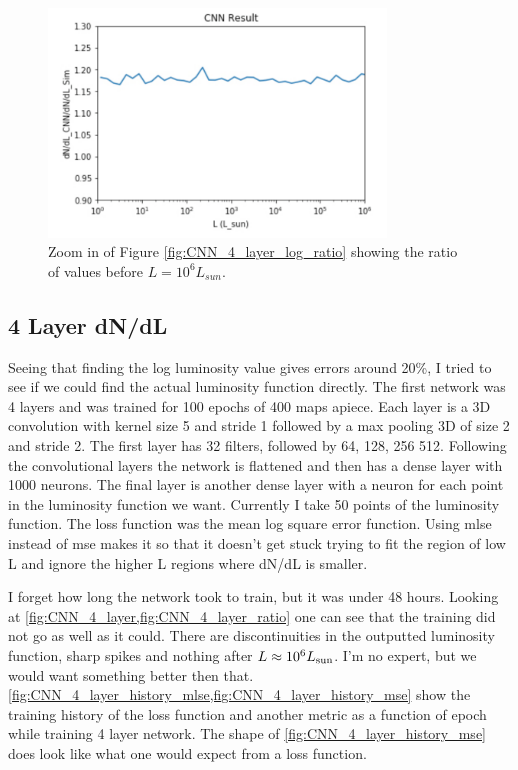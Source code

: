 \documentclass{article}
\begin{document}
			\begin{figure}[H]
				\centering
				\includegraphics[width=0.8\textwidth]{CNN_4_layer_log_unlog_ratio_small.pdf}
				\caption{Zoom in of Figure \ref{fig:CNN_4_layer_log_ratio} showing the ratio of values before \(L = 10^6 L_{sun}\).}
				\label{fig:CNN_4_layer_log_unlog_ratio_small}
			\end{figure}

		\subsection{4 Layer dN/dL} \label{sec:4directValue}
			Seeing that finding the log luminosity value gives errors around 20\%, I tried to see if we could find the actual luminosity function directly.  The first network was 4 layers and was trained for 100 epochs of 400 maps apiece.  Each layer is a 3D convolution with kernel size 5 and stride 1 followed by a max pooling 3D of size 2 and stride 2.  The first layer has 32 filters, followed by 64, 128, 256 512.  Following the convolutional layers the network is flattened and then has a dense layer with 1000 neurons.  The final layer is another dense layer with a neuron for each point in the luminosity function we want.  Currently I take 50 points of the luminosity function.  The loss function was the mean log square error function.  Using mlse instead of mse makes it so that it doesn't get stuck trying to fit the region of low L and ignore the higher L regions where dN/dL is smaller. 

			I forget how long the network took to train, but it was under 48 hours.  Looking at \cref{fig:CNN_4_layer,fig:CNN_4_layer_ratio} one can see that the training did not go as well as it could.  There are discontinuities in the outputted luminosity function, sharp spikes and nothing after \(L \approx 10^6 L_{\rm{sun}}\).  I'm no expert, but we would want something better then that.  \cref{fig:CNN_4_layer_history_mlse,fig:CNN_4_layer_history_mse} show the training history of the loss function and another metric as a function of epoch while training 4 layer network.  The shape of \cref{fig:CNN_4_layer_history_mse} does look like what one would expect from a loss function.
\end{document}
